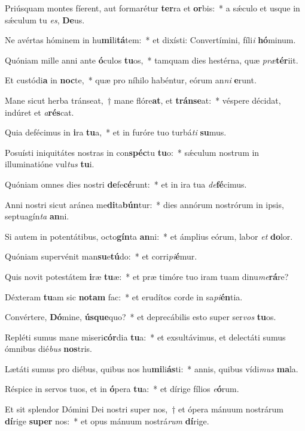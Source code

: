 \item Priúsquam montes fíerent, aut formarétur \textbf{ter}ra et \textbf{or}bis:~* a sǽculo et usque in sǽculum tu \textit{es}, \textbf{De}us.
\item Ne avértas hóminem in hu\textbf{mi}li\textbf{tá}tem:~* et dixísti: Convertímini, fíli\textit{i} \textbf{hó}minum.
\item Quóniam mille anni ante \textbf{ó}culos \textbf{tu}os,~* tamquam dies hestérna, quæ \textit{præ}\textbf{tér}iit.
\item Et custódi\textbf{a} in \textbf{noc}te,~* quæ pro níhilo habéntur, eórum an\textit{ni} \textbf{e}runt.
\item Mane sicut herba tránseat,~† mane flóre\textbf{at}, et \textbf{tráns}\textbf{e}at:~* véspere décidat, indúret et \textit{a}\textbf{rés}cat.
\item Quia defécimus in \textbf{i}ra \textbf{tu}a,~* et in furóre tuo turbá\textit{ti} \textbf{su}mus.
\item Posuísti iniquitátes nostras in con\textbf{spéc}tu \textbf{tu}o:~* sǽculum nostrum in illuminatióne vul\textit{tus} \textbf{tu}i.
\item Quóniam omnes dies nostri \textbf{de}fe\textbf{cé}runt:~* et in ira tua \textit{de}\textbf{fé}cimus.
\item Anni nostri sicut aránea me\textbf{di}ta\textbf{bún}tur:~* dies annórum nostrórum in ipsis, septuagín\textit{ta} \textbf{an}ni.
\item Si autem in potentátibus, octo\textbf{gín}ta \textbf{an}ni:~* et ámplius eórum, labor \textit{et} \textbf{do}lor.
\item Quóniam supervénit man\textbf{su}e\textbf{tú}do:~* et corri\textit{pi}\textbf{é}mur.
\item Quis novit potestátem \textbf{i}ræ \textbf{tu}æ:~* et præ timóre tuo iram tuam dinu\textit{me}\textbf{rá}re?
\item Déxteram \textbf{tu}am sic \textbf{no}\textbf{tam} fac:~* et erudítos corde in sa\textit{pi}\textbf{én}tia.
\item Convértere, \textbf{Dó}mine, \textbf{ús}\textbf{que}quo?~* et deprecábilis esto super ser\textit{vos} \textbf{tu}os.
\item Repléti sumus mane miseri\textbf{cór}dia \textbf{tu}a:~* et exsultávimus, et delectáti sumus ómnibus dié\textit{bus} \textbf{nos}tris.
\item Lætáti sumus pro diébus, quibus nos hu\textbf{mi}li\textbf{ás}ti:~* annis, quibus vídi\textit{mus} \textbf{ma}la.
\item Réspice in servos tuos, et in \textbf{ó}pera \textbf{tu}a:~* et dírige fílios \textit{e}\textbf{ó}rum.
\item Et sit splendor Dómini Dei nostri super nos,~† et ópera mánuum nostrárum \textbf{dí}rige \textbf{su}\textbf{per} nos:~* et opus mánuum nostrá\textit{rum} \textbf{dí}rige.
